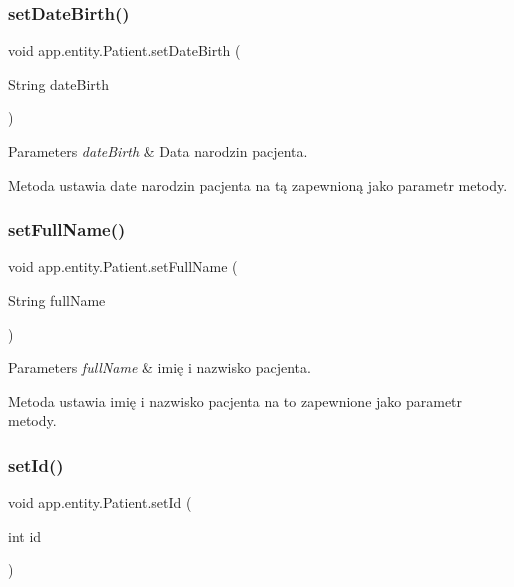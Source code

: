 \subsubsection{\texorpdfstring{setDateBirth()}{setDateBirth()}}
{\footnotesize\ttfamily void app.\+entity.\+Patient.\+set\+Date\+Birth (\begin{DoxyParamCaption}\item[{String}]{date\+Birth }\end{DoxyParamCaption})}


\begin{DoxyParams}{Parameters}
{\em date\+Birth} & Data narodzin pacjenta.\\
\hline
\end{DoxyParams}
Metoda ustawia date narodzin pacjenta na tą zapewnioną jako parametr metody. \mbox{\label{classapp_1_1entity_1_1_patient_ae0e30fedfdb523f3cf2945b254ab004c}} 
\subsubsection{\texorpdfstring{setFullName()}{setFullName()}}
{\footnotesize\ttfamily void app.\+entity.\+Patient.\+set\+Full\+Name (\begin{DoxyParamCaption}\item[{String}]{full\+Name }\end{DoxyParamCaption})}


\begin{DoxyParams}{Parameters}
{\em full\+Name} & imię i nazwisko pacjenta.\\
\hline
\end{DoxyParams}
Metoda ustawia imię i nazwisko pacjenta na to zapewnione jako parametr metody. \mbox{\label{classapp_1_1entity_1_1_patient_a7fa8873eaa6bd53e10606a11f0a68c1f}} 
\subsubsection{\texorpdfstring{setId()}{setId()}}
{\footnotesize\ttfamily void app.\+entity.\+Patient.\+set\+Id (\begin{DoxyParamCaption}\item[{int}]{id }\end{DoxyParamCaption})}


